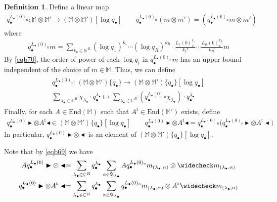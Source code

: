 \documentclass[11pt,b5paper,notitlepage]{article}
\theoremstyle{definition}
\newtheorem{df}{Definition}[subsection]
\theoremstyle{plain}
\newcommand{\fk}{\mathfrak}
\newcommand{\wch}{\widecheck}
\newcommand{\tr}{\mathrm{t}} %
\newcommand{\End}{\mathrm{End}} %
\newcommand{\blt}{\bullet}
\newcommand{\Mbb}{\mathbb M}
\newcommand{\Cbb}{\mathbb C}
\newcommand{\Nbb}{\mathbb N}
\newcommand{\btl}{\blacktriangleleft}
\newcommand{\btr}{\blacktriangleright}
\newcommand{\<}{\left\langle}
\renewcommand{\>}{\right\rangle}
\newcommand{\Lbni}{{L_\bullet(0)_\mathrm{n}}}
\newcommand{\Lbss}{{L_\bullet(0)_\mathrm{s}}}
\numberwithin{equation}{subsection}
\begin{document}
\begin{df}
Define a linear map
\begin{gather*}
q_\blt^{\Lbni}:\Mbb\otimes\Mbb'\rightarrow(\Mbb\otimes\Mbb')[\log q_\blt] \qquad q_\blt^{\Lbni}(m\otimes m')=(q_\blt^{\Lbni}m\otimes m')
\end{gather*}
where
\begin{align*}
q_\blt^{\Lbni}m=\sum_{k_\blt\in\Nbb^R}(\log q_1)^{k_1}\cdots(\log q_R)^{k_R}\cdot\frac{L_1(0)_{\mathrm n}^{k_1}}{k_1!}\cdots\frac{L_R(0)_{\mathrm n}^{k_R}}{k_R!} m
\end{align*}
By \eqref{eqb70}, the order of power of each $\log q_i$ in $q_\blt^{\Lbni}m$ has an upper bound independent of the choice of $m\in\Mbb$. Thus, we can define
\begin{gather}\label{eqb71}
\begin{gathered}
q_\blt^{\Lbni}:(\Mbb\otimes\Mbb')\{q_\blt\}\rightarrow (\Mbb\otimes\Mbb')\{q_\blt\}[\log q_\blt]\\[0.5ex] \sum_{\lambda_\blt\in\Cbb^R}\chi_{\lambda_\blt}\cdot q_\blt^{\lambda_\blt}\mapsto \sum_{\lambda_\blt\in\Cbb^R}(q_\blt^{\Lbni}\chi_{\lambda_\blt})\cdot q_\blt^{\lambda_\blt}
\end{gathered}
\end{gather}
Finally, for each $A\in\End(\Mbb)$ such that $A^\tr\in\End(\Mbb')$ exists, define
\begin{gather*}
q_\blt^{L_\blt(0)} \btr\otimes A^\tr\btl\in(\Mbb\otimes\Mbb')\{q_\blt\}[\log q_\blt]\qquad q_\blt^{L_\blt(0)} \btr\otimes A^\tr\btl=q_\blt^{\Lbni}\big(q_\blt^{\Lbss}\btr\otimes A^\tr\btl\big)
\end{gather*}
In particular, $q_\blt^{L_\blt(0)} \btr\otimes\btl$ is an element of $(\Mbb\otimes\Mbb')\{q_\blt\}[\log q_\blt]$. 
\end{df}

Note that by \eqref{eqb69} we have
\begin{subequations}\label{eqb73}
\begin{gather}
Aq_\blt^{L_\blt(0)} \btr\otimes\btl=\sum_{\lambda_\blt\in\Cbb^R}q_\blt^{\lambda_\blt}\sum_{\alpha\in\fk A_{\lambda_\blt}} Aq_\blt^{\Lbni}m_{(\lambda_\blt,\alpha)}\otimes \wch m_{(\lambda_\blt,\alpha)}\\
q_\blt^{L_\blt(0)} \btr\otimes A^\tr\btl=\sum_{\lambda_\blt\in\Cbb^R}q_\blt^{\lambda_\blt}\sum_{\alpha\in\fk A_{\lambda_\blt}} q_\blt^{\Lbni}m_{(\lambda_\blt,\alpha)}\otimes A^\tr \wch m_{(\lambda_\blt,\alpha)}
\end{gather}
\end{subequations}
\end{document}
